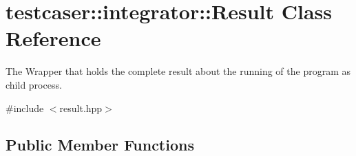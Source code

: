 \hypertarget{classtestcaser_1_1integrator_1_1Result}{}\section{testcaser\+:\+:integrator\+:\+:Result Class Reference}
\label{classtestcaser_1_1integrator_1_1Result}


The Wrapper that holds the complete result about the running of the program as child process.  




{\ttfamily \#include $<$result.\+hpp$>$}

\subsection*{Public Member Functions}
